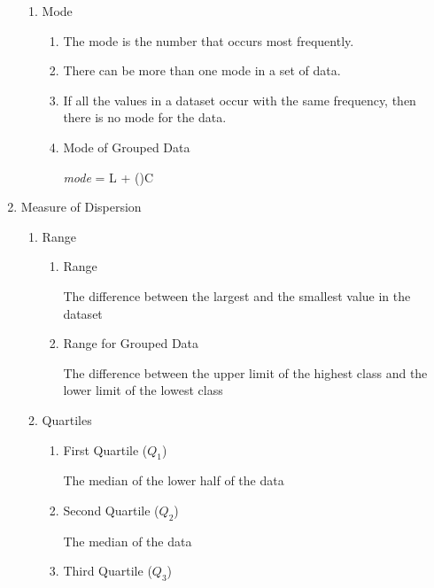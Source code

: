 \documentclass{report}
\begin{document}
\begin{multicols}{2}
\begin{enumerate}
\begin{enumerate}
            \item Mode
                  \begin{enumerate}
                    \item The mode is the number that occurs most frequently.
                    \item There can be more than one mode in a set of data.
                    \item If all the values in a dataset occur with the same frequency, then there is no
                          mode for the data.
                    \item Mode of Grouped Data \begin{cequation}
                            \textit{mode} = L + \left(\right)C
                          \end{cequation}
                  \end{enumerate}
          \end{enumerate}
    \item Measure of Dispersion
          \begin{enumerate}
            \item Range
                  \begin{enumerate}
                    \item Range

                          The difference between the largest and the smallest value in the dataset

                    \item Range for Grouped Data

                          The difference between the upper limit of the highest class and the lower limit
                          of the lowest class
                  \end{enumerate}
            \item Quartiles
                  \begin{enumerate}
                    \item First Quartile ($Q_1$)

                          The median of the lower half of the data
                    \item Second Quartile ($Q_2$)

                          The median of the data
                    \item Third Quartile ($Q_3$)


\end{enumerate}
\end{enumerate}
\end{enumerate}
\end{multicols}
\end{document}
